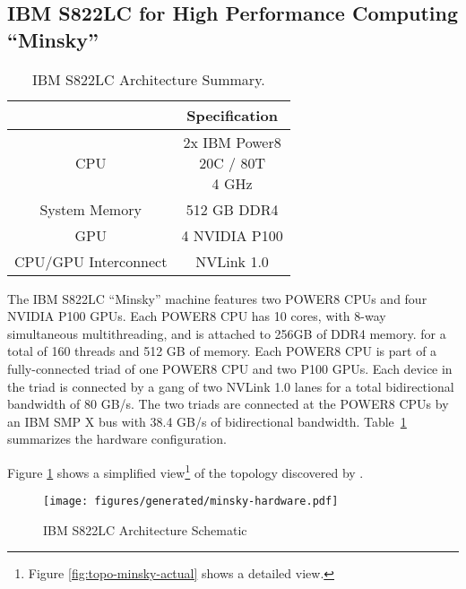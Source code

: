 \subsection{IBM S822LC for High Performance Computing ``Minsky''}
\label{sec:s822lc}


\begin{table}[]
    \centering
    \caption[IBM S822LC Architecture Summary]{IBM S822LC Architecture Summary.}
    \label{tab:minsky}
    \begin{tabular}{|c|c|}
    \hline
    \textbf{} & \textbf{Specification}                              \\ \hline
    CPU           & \makecell{2x IBM Power8 \\ 20C / 80T \\ 4 GHz}  \\ \hline
    System Memory & 512 GB DDR4                                    \\ \hline
	GPU           & 4 NVIDIA P100                                   \\ \hline
	CPU/GPU Interconnect  & NVLink 1.0                                      \\ \hline
    \end{tabular}
\end{table}

The IBM S822LC ``Minsky'' machine features two POWER8 CPUs and four NVIDIA P100 GPUs\cite{caldeira2016s822lc}.
Each POWER8 CPU has 10 cores, with 8-way simultaneous multithreading, and is attached to 256GB of DDR4 memory. for a total of 160 threads and 512 GB of memory.
Each POWER8 CPU is part of a fully-connected triad of one POWER8 CPU and two P100 GPUs.
Each device in the triad is connected by a gang of two NVLink 1.0 lanes for a total bidirectional bandwidth of 80 GB/s.
The two triads are connected at the POWER8 CPUs by an IBM SMP X bus with 38.4 GB/s of bidirectional bandwidth.
Table~\ref{tab:minsky} summarizes the hardware configuration.

Figure \ref{fig:topo-minsky-simple} shows a simplified view\footnote{Figure \ref{fig:topo-minsky-actual} shows a detailed view.} of the topology discovered by .


\begin{figure}
    \centering
	\texttt{[image: figures/generated/minsky-hardware.pdf]}
    \caption[IBM S822LC Architecture Schematic]{IBM S822LC Architecture Schematic}
    \label{fig:topo-minsky-simple}
\end{figure}


